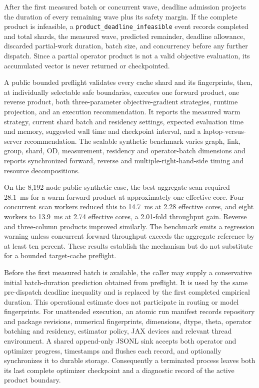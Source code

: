 After the first measured batch or concurrent wave, deadline admission projects
the duration of every remaining wave plus its safety margin.  If the complete
product is infeasible, a \texttt{product\_deadline\_infeasible} event records
completed and total shards, the measured wave, predicted remainder, deadline
allowance, discarded partial-work duration, batch size, and concurrency before
any further dispatch.  Since a partial operator product is not a valid
objective evaluation, its accumulated vector is never returned or
checkpointed.

A public bounded preflight validates every cache shard and its fingerprints,
then, at individually selectable safe boundaries, executes one forward
product, one reverse product, both three-parameter objective-gradient
strategies, runtime projection, and an execution recommendation.  It reports
the measured warm strategy, current shard batch and residency settings,
expected evaluation time and memory, suggested wall time and checkpoint
interval, and a laptop-versus-server recommendation.  The scalable synthetic
benchmark varies graph, link, group, shard, OD, measurement, residency and
operator-batch dimensions and reports synchronized forward, reverse and
multiple-right-hand-side timing and resource decompositions.

On the 8,192-node public synthetic case, the best aggregate scan required
28.1~ms for a warm forward product at approximately one effective core.  Four
concurrent scan workers reduced this to 14.7~ms at 2.28 effective cores, and
eight workers to 13.9~ms at 2.74 effective cores, a 2.01-fold throughput gain.
Reverse and three-column products improved similarly.  The benchmark emits a
regression warning unless concurrent forward throughput exceeds the aggregate
reference by at least ten percent.  These results establish the mechanism but
do not substitute for a bounded target-cache preflight.

Before the first measured batch is available, the caller may supply a
conservative initial batch-duration prediction obtained from preflight.  It is
used by the same pre-dispatch deadline inequality and is replaced by the first
completed empirical duration.  This operational estimate does not participate
in routing or model fingerprints.  For unattended execution, an atomic run
manifest records repository and package revisions, numerical fingerprints,
dimensions, dtype, theta, operator batching and residency, estimator policy,
JAX devices and relevant thread environment.  A shared append-only JSONL sink
accepts both operator and optimizer progress, timestamps and flushes each
record, and optionally synchronizes it to durable storage.  Consequently a
terminated process leaves both its last complete optimizer checkpoint and a
diagnostic record of the active product boundary.

